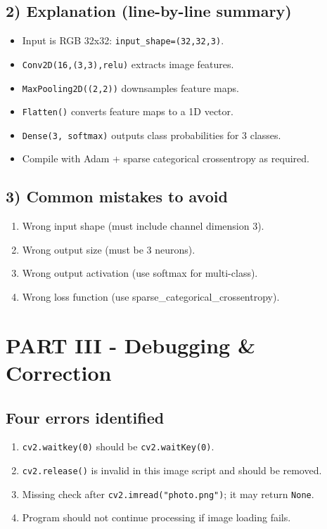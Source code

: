 \documentclass[11pt]{article}
\begin{document}
\subsection*{2) Explanation (line-by-line summary)}
\begin{itemize}[leftmargin=*]
\item Input is RGB 32x32: \texttt{input\_shape=(32,32,3)}.
\item \texttt{Conv2D(16,(3,3),relu)} extracts image features.
\item \texttt{MaxPooling2D((2,2))} downsamples feature maps.
\item \texttt{Flatten()} converts feature maps to a 1D vector.
\item \texttt{Dense(3, softmax)} outputs class probabilities for 3 classes.
\item Compile with Adam + sparse categorical crossentropy as required.
\end{itemize}

\subsection*{3) Common mistakes to avoid}
\begin{enumerate}[leftmargin=*]
\item Wrong input shape (must include channel dimension 3).
\item Wrong output size (must be 3 neurons).
\item Wrong output activation (use softmax for multi-class).
\item Wrong loss function (use sparse\_categorical\_crossentropy).
\end{enumerate}

\section*{PART III - Debugging \& Correction}
\subsection*{Four errors identified}
\begin{enumerate}[leftmargin=*]
\item \texttt{cv2.waitkey(0)} should be \texttt{cv2.waitKey(0)}.
\item \texttt{cv2.release()} is invalid in this image script and should be removed.
\item Missing check after \texttt{cv2.imread("photo.png")}; it may return \texttt{None}.
\item Program should not continue processing if image loading fails.
\end{enumerate}
\end{document}
